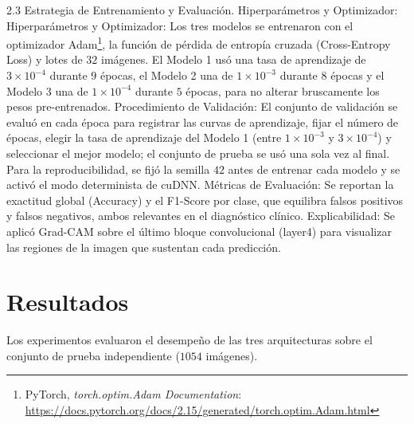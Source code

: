 \documentclass[letterpaper, 10 pt, conference]{ieeeconf}  %
\begin{document}
2.3 Estrategia de Entrenamiento y Evaluación.
Hiperparámetros y Optimizador: Hiperparámetros y Optimizador: Los tres modelos se entrenaron con el optimizador Adam\footnote{PyTorch, \emph{torch.optim.Adam Documentation}: \url{https://docs.pytorch.org/docs/2.15/generated/torch.optim.Adam.html}}, la función de pérdida de entropía cruzada (Cross-Entropy Loss) y lotes de $32$ imágenes. El Modelo 1 usó una tasa de aprendizaje de $3\times 10^{-4}$ durante $9$ épocas, el Modelo 2 una de $1\times 10^{-3}$ durante $8$ épocas y el Modelo 3 una de $1\times 10^{-4}$ durante $5$ épocas, para no alterar bruscamente los pesos pre-entrenados.
Procedimiento de Validación: El conjunto de validación se evaluó en cada época para registrar las curvas de aprendizaje, fijar el número de épocas, elegir la tasa de aprendizaje del Modelo 1 (entre $1\times 10^{-3}$ y $3\times 10^{-4}$) y seleccionar el mejor modelo; el conjunto de prueba se usó una sola vez al final. Para la reproducibilidad, se fijó la semilla $42$ antes de entrenar cada modelo y se activó el modo determinista de cuDNN.
Métricas de Evaluación: Se reportan la exactitud global (Accuracy) y el F1-Score por clase, que equilibra falsos positivos y falsos negativos, ambos relevantes en el diagnóstico clínico.
Explicabilidad: Se aplicó Grad-CAM sobre el último bloque convolucional (layer4) para visualizar las regiones de la imagen que sustentan cada predicción.

\section{Resultados}

Los experimentos evaluaron el desempeño de las tres arquitecturas sobre el conjunto de prueba independiente ($1054$ imágenes).
\end{document}
